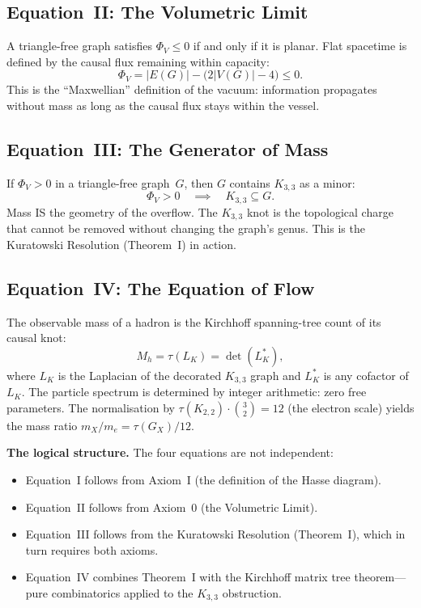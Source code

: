 \documentclass[11pt, a4paper, openany]{book}
\newcounter{thm}[chapter]
\begin{document}
\subsection{Equation~II: The Volumetric Limit}

A triangle-free graph satisfies $\Phi_V \leq 0$ if and only if it
is planar. Flat spacetime is defined by the causal flux remaining
within capacity:
\begin{equation}\label{eq:volumetric-eq}
  \Phi_V = |E(G)| - \bigl(2|V(G)| - 4\bigr) \leq 0.
\end{equation}
This is the ``Maxwellian'' definition of the vacuum: information
propagates without mass as long as the causal flux stays within the
vessel.

\subsection{Equation~III: The Generator of Mass}

If $\Phi_V > 0$ in a triangle-free graph~$G$, then $G$ contains
$K_{3,3}$ as a minor:
\begin{equation}\label{eq:generator-of-mass}
  \Phi_V > 0 \quad\implies\quad K_{3,3} \subseteq G.
\end{equation}
Mass IS the geometry of the overflow. The $K_{3,3}$ knot is the
topological charge that cannot be removed without changing the graph's
genus. This is the Kuratowski Resolution (Theorem~I) in action.

\subsection{Equation~IV: The Equation of Flow}

The observable mass of a hadron is the Kirchhoff spanning-tree count
of its causal knot:
\begin{equation}\label{eq:equation-of-flow}
  M_h = \tau(L_K) = \det(L_K^*),
\end{equation}
where $L_K$ is the Laplacian of the decorated $K_{3,3}$ graph and
$L_K^*$ is any cofactor of $L_K$. The particle spectrum is determined by
integer arithmetic: zero free parameters. The normalisation by
$\tau(K_{2,2}) \cdot \binom{3}{2} = 12$ (the electron scale) yields
the mass ratio $m_X/m_e = \tau(G_X)/12$.

\medskip\noindent
\textbf{The logical structure.} The four equations are not independent:
\begin{itemize}
  \item Equation~I follows from Axiom~I (the definition of the Hasse
    diagram).
  \item Equation~II follows from Axiom~0 (the Volumetric Limit).
  \item Equation~III follows from the Kuratowski Resolution
    (Theorem~I), which in turn requires both axioms.
  \item Equation~IV combines Theorem~I with the Kirchhoff matrix tree
    theorem---pure combinatorics applied to the $K_{3,3}$ obstruction.
\end{itemize}
\end{document}
